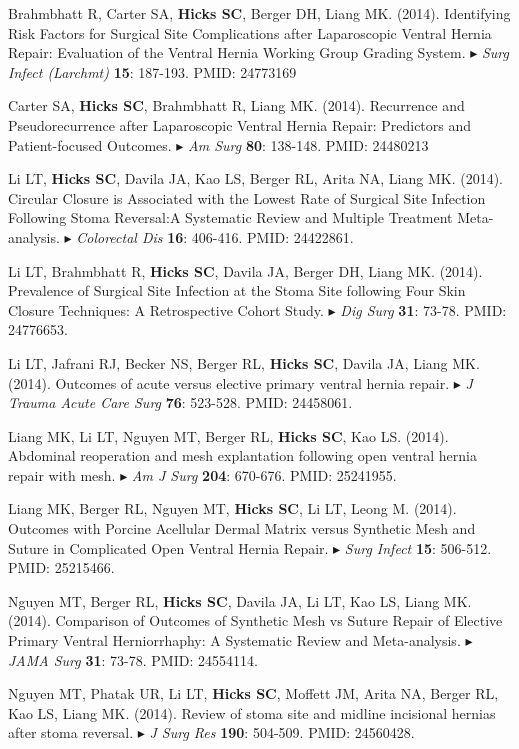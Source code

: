 \documentclass[10pt]{article}
\newcommand{\dg}[1]{{\color{black} $\blacktriangleright$ {#1}}}
\begin{document}
\item Brahmbhatt R, Carter SA, {\bf Hicks SC}, Berger DH, Liang MK. (2014). Identifying Risk Factors for Surgical Site Complications after Laparoscopic Ventral Hernia Repair: Evaluation of the Ventral Hernia Working Group Grading System. \dg{{\it Surg Infect (Larchmt)} {\bf 15}: 187-193. PMID: 24773169}
\item Carter SA, {\bf Hicks SC}, Brahmbhatt R, Liang MK. (2014). Recurrence and Pseudorecurrence after Laparoscopic Ventral Hernia Repair: Predictors and Patient-focused Outcomes. \dg{{\it Am Surg} {\bf 80}: 138-148. PMID: 24480213}
\item Li LT, {\bf Hicks SC}, Davila JA, Kao LS, Berger RL, Arita NA, Liang MK. (2014). Circular Closure is Associated with the Lowest Rate of Surgical Site Infection Following Stoma Reversal:A Systematic Review and Multiple Treatment Meta-analysis. \dg{{\it Colorectal Dis} {\bf 16}: 406-416. PMID: 24422861}.
\item Li LT, Brahmbhatt R, {\bf Hicks SC}, Davila JA, Berger DH, Liang MK. (2014). Prevalence of Surgical Site Infection at the Stoma Site following Four Skin Closure Techniques: A Retrospective Cohort Study. \dg{{\it Dig Surg} {\bf 31}: 73-78. PMID: 24776653}.
\item Li LT, Jafrani RJ, Becker NS, Berger RL,  {\bf Hicks SC}, Davila JA, Liang MK. (2014). Outcomes of acute versus elective primary ventral hernia repair. \dg{{\it J Trauma Acute Care Surg} {\bf 76}: 523-528. PMID: 24458061}.
\item Liang MK, Li LT, Nguyen MT, Berger RL, {\bf Hicks SC}, Kao LS. (2014). Abdominal reoperation and mesh explantation following open ventral hernia repair with mesh. \dg{{\it Am J Surg} {\bf 204}: 670-676. PMID: 25241955}.
\item Liang MK, Berger RL, Nguyen MT, {\bf Hicks SC}, Li LT, Leong M. (2014). Outcomes with Porcine Acellular Dermal Matrix versus Synthetic Mesh and Suture in Complicated Open Ventral Hernia Repair. \dg{{\it Surg Infect} {\bf 15}: 506-512. PMID: 25215466}.
\item Nguyen MT, Berger RL, {\bf Hicks SC}, Davila JA, Li LT, Kao LS, Liang MK. (2014). Comparison of Outcomes of Synthetic Mesh vs Suture Repair of Elective Primary Ventral Herniorrhaphy: A Systematic Review and Meta-analysis. \dg{{\it JAMA Surg} {\bf 31}: 73-78. PMID: 24554114}.
\item Nguyen MT, Phatak UR, Li LT, {\bf Hicks SC}, Moffett JM, Arita NA, Berger RL, Kao LS, Liang MK. (2014). Review of stoma site and midline incisional hernias after stoma reversal. \dg{{\it J Surg Res} {\bf 190}: 504-509. PMID: 24560428}.
\end{document}
